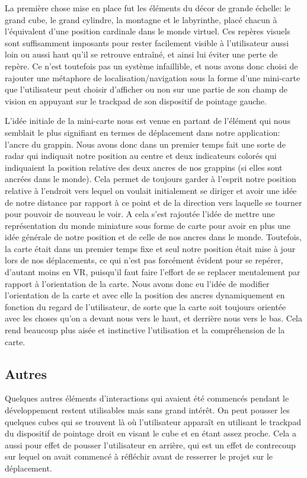 \documentclass[a4paper]{elsarticle}
\begin{document}
La première chose mise en place fut les éléments du décor de grande échelle: le grand cube, le grand cylindre, la montagne et le labyrinthe, placé chacun à l’équivalent d’une position cardinale dans le monde virtuel. Ces repères visuels sont suffisamment imposants pour rester facilement visible à l’utilisateur aussi loin ou aussi haut qu’il se retrouve entraîné, et ainsi lui éviter une perte de repère. Ce n’est toutefois pas un système infaillible, et nous avons donc choisi de rajouter une métaphore de localisation/navigation sous la forme d’une mini-carte que l’utilisateur peut choisir d’afficher ou non sur une partie de son champ de vision en appuyant sur le trackpad de son dispositif de pointage gauche.

L’idée initiale de la mini-carte nous est venue en partant de l’élément qui nous semblait le plus signifiant en termes de déplacement dans notre application: l’ancre du grappin. Nous avons donc dans un premier temps fait une sorte de radar qui indiquait notre position au centre et deux indicateurs colorés qui indiquaient la position relative des deux ancres de nos grappins (si elles sont ancrées dans le monde). Cela permet de toujours garder à l’esprit notre position relative à l’endroit vers lequel on voulait initialement se diriger et avoir une idée de notre distance par rapport à ce point et de la direction vers laquelle se tourner pour pouvoir de nouveau le voir. A cela s’est rajoutée l’idée de mettre une représentation du monde miniature sous forme de carte pour avoir en plus une idée générale de notre position et de celle de nos ancres dans le monde. Toutefois, la carte était dans un premier temps fixe et seul notre position était mise à jour lors de nos déplacements, ce qui n’est pas forcément évident pour se repérer, d’autant moins en VR, puisqu’il faut faire l’effort de se replacer mentalement par rapport à l’orientation de la carte. Nous avons donc eu l’idée de modifier l’orientation de la carte et avec elle la position des ancres dynamiquement en fonction du regard de l’utilisateur, de sorte que la carte soit toujours orientée avec les choses qu’on a devant nous vers le haut, et derrière nous vers le bas. Cela rend beaucoup plus aisée et instinctive l’utilisation et la compréhension de la carte.

\subsection{Autres}

Quelques autres éléments d’interactions qui avaient été commencés pendant le développement restent utilisables mais sans grand intérêt. On peut pousser les quelques cubes qui se trouvent là où l’utilisateur apparaît en utilisant le trackpad du dispositif de pointage droit en visant le cube et en étant assez proche. Cela a aussi pour effet de pousser l’utilisateur en arrière, qui est un effet de contrecoup sur lequel on avait commencé à réfléchir avant de resserrer le projet sur le déplacement.
\end{document}
